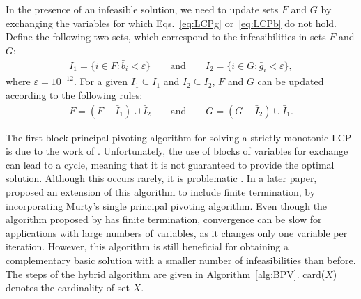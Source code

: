 \documentclass[11pt]{article}
\newcommand{\0}{\phantom{0}}
\begin{document}
In the presence of an infeasible solution, we need to update sets $F$ and $G$ by exchanging the variables for which Eqs.~\eqref{eq:LCPg} or~\eqref{eq:LCPb} do not hold. Define the following two sets, which correspond to the infeasibilities in sets $F$ and $G$:
\begin{align}
	\label{eq:indexset}
	I_{1} = \{i \in F: \bar{b}_{i} < \varepsilon\} \qquad \text{and} \qquad I_{2} = \{i \in G: \bar{g}_{i} < \varepsilon\},
\end{align}
where $\varepsilon = 10^{-12}$. For a given $\bar{I}_{1} \subseteq I_{1}$ and $\bar{I}_{2} \subseteq I_{2}$, $F$ and $G$ can be updated according to the following rules:
\begin{align}
	\label{eq:indexsetrev}
	F = (F - \bar{I}_{1}) \cup \bar{I}_{2} \qquad \text{and} \qquad G = (G - \bar{I}_{2}) \cup \bar{I}_{1}.
\end{align}

The first block principal pivoting algorithm for solving a strictly monotonic LCP is due to the work of \citet{Kost1978}. Unfortunately, the use of blocks of variables for exchange can lead to a cycle, meaning that it is not guaranteed to provide the optimal solution. Although this occurs rarely, it is problematic \citep{Judice1989}. In a later paper, \citet{Judice1994} proposed an extension of this algorithm to include finite termination, by incorporating Murty's single principal pivoting algorithm. Even though the algorithm proposed by \citet{Murty1974} has finite termination, convergence can be slow for applications with large numbers of variables, as it changes only one variable per iteration. However, this algorithm is still beneficial for obtaining a complementary basic solution with a smaller number of infeasibilities than before. The steps of the hybrid algorithm are given in Algorithm~\ref{alg:BPV}. card($X$) denotes the cardinality of set $X$.
\end{document}
